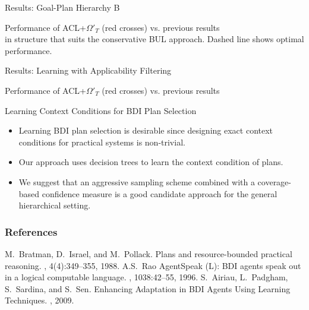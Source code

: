 \documentclass[]{beamer}
\begin{document}
\begin{frame}[allowframebreaks]{Results: Goal-Plan Hierarchy B}

\centering\resizebox{.7\paperwidth}{!}{}

Performance of ACL+$\Omega'_T$ (red crosses) vs. previous results\\ in structure that suits the conservative \alert{BUL} approach. Dashed line shows optimal performance.

\end{frame}

\begin{frame}[allowframebreaks]{Results: Learning with Applicability Filtering}

\centering\resizebox{.7\paperwidth}{!}{}

Performance of ACL+$\Omega'_T$ (red crosses) vs. previous results

\end{frame}

\begin{frame}{Learning Context Conditions for BDI Plan Selection}
\begin{itemize}
\item<+-> Learning BDI plan selection is desirable since designing exact \alert{context conditions} for practical systems is non-trivial.
\end{itemize}
\begin{itemize}
\item<+-> Our approach uses decision trees to learn the context condition of plans.
\end{itemize}
\begin{itemize}
\item<+-> We suggest that an \alert{aggressive sampling scheme} combined with a \alert{coverage-based confidence measure} is a good candidate approach for the general hierarchical setting.
\end{itemize}
\end{frame}

\setcounter{finalframe}{\value{framenumber}}
\appendix

\begin{frame}
\setcounter{framenumber}{\value{finalframe}}
  \frametitle<presentation>{References}
  \begin{thebibliography}{10}
  \beamertemplatearticlebibitems
	M.~Bratman, D.~Israel, and M.~Pollack.
	\newblock Plans and resource-bounded practical reasoning.
	, 4(4):349--355, 1988.
    A.S.~Rao
	\newblock AgentSpeak (L): BDI agents speak out in a logical computable language.
	, 1038:42--55, 1996.
	S.~Airiau, L.~Padgham, S.~Sardina, and S.~Sen.
	\newblock Enhancing Adaptation in {BDI} Agents Using Learning Techniques.
	, 2009.
  \end{thebibliography}
\end{frame}
\end{document}
